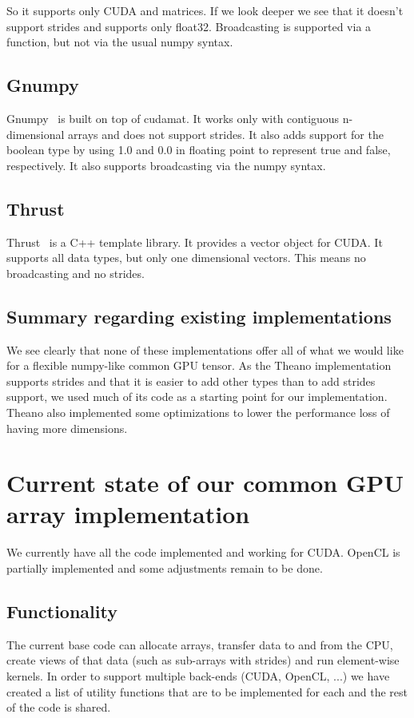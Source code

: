 \documentclass{article} %
\begin{document}
So it supports only CUDA and matrices. 
If we look deeper we see that it doesn't support strides and supports only float32. 
Broadcasting is supported via a function, but not via the usual numpy syntax.

\subsection{Gnumpy}
Gnumpy~\citep{gnumpy-TR2010} is built on top of cudamat.
It works only with contiguous n-dimensional arrays and does not support strides.
It also adds support for the boolean type by using 1.0 and 0.0 in floating point to represent true and false, respectively. 
It also supports broadcasting via the numpy syntax.

\subsection{Thrust}
Thrust~\citep{Thrust} is a C++ template library.
It provides a vector object for CUDA.
It supports all data types, but only one dimensional vectors.
This means no broadcasting and no strides.

\subsection{Summary regarding existing implementations}
We see clearly that none of these implementations offer all of what we would like for a flexible numpy-like common GPU tensor.
As the Theano implementation supports strides and that it is easier to add other types than to add strides support, we used much of its code as a starting point for our implementation.
Theano also implemented some optimizations to lower the performance loss of having more dimensions.

\section{Current state of our common GPU array implementation}
\label{sec:currentimpl}
We currently have all the code implemented and working for CUDA.
OpenCL is partially implemented and some adjustments remain to be done.

\subsection{Functionality}

The current base code can allocate arrays, transfer data to and from the CPU, create views of that data (such as sub-arrays with strides) and run element-wise kernels.
In order to support multiple back-ends (CUDA, OpenCL, ...) we have created a list of utility functions that are to be implemented for each 
and the rest of the code is shared.
\end{document}
